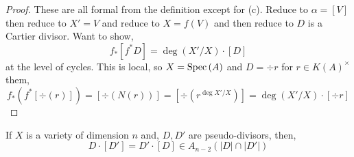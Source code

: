 \documentclass[12pt]{article}
\begin{document}
\begin{proof}
These are all formal from the definition except for (c). Reduce to $\alpha = [V]$ then reduce to $X' = V$ and reduce to $X = f(V)$ and then reduce to $D$ is a Cartier divisor. Want to show,
\[ f_* [f^* D] = \deg(X'/X) \cdot [D] \]
at the level of cycles. This is local, so $X = \mathrm{Spec}\left( A \right)$ and $D = \div{r}$ for $r \in K(A)^\times$ them,
\[ f_* (f^* [\div(r)]) = [\div(N(r))] = [\div(r^{\deg{X'/X}})] = \deg{(X'/X)} \cdot [\div{r}] \]
\end{proof}

\begin{theorem}
If $X$ is a variety of dimension $n$ and, $D, D'$ are pseudo-divisors, then,
\[ D \cdot [D'] = D' \cdot [D] \in A_{n-2}(|D| \cap |D'|) \]
\end{theorem}

\newcommand{\LL}{\mathbb{L}}
\end{document}
